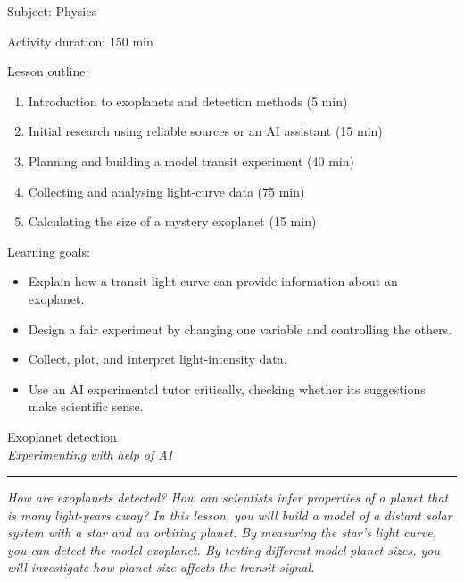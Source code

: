 \documentclass[12pt]{article}
\begin{document}
\hypersetup{pageanchor=true}

\vspace*{0.5\textheight}

Subject: Physics


\vspace{0.3cm}

Activity duration: 150 min

\vspace{0.5cm}

Lesson outline:
\begin{enumerate}
    \item Introduction to exoplanets and detection methods (5 min)
    \item Initial research using reliable sources or an AI assistant (15 min)
    \item Planning and building a model transit experiment (40 min)
    \item Collecting and analysing light-curve data (75 min)
    \item Calculating the size of a mystery exoplanet (15 min)
\end{enumerate}

Learning goals:

\begin{itemize}
    \item Explain how a transit light curve can provide information about an exoplanet.
    \item Design a fair experiment by changing one variable and controlling the others.
    \item Collect, plot, and interpret light-intensity data.
    \item Use an AI experimental tutor critically, checking whether its suggestions make scientific sense.
\end{itemize}

\newpage

\begin{center}
    {\LARGE \color{maincolor} Exoplanet detection}\\[5pt]
    {\large \textit{Experimenting with help of AI}}\\
    \rule{\linewidth}{1pt}
\end{center}

\vspace{0.5cm}

\textit{How are exoplanets detected? How can scientists infer properties of a planet that is many light-years away? In this lesson, you will build a model of a distant solar system with a star and an orbiting planet. By measuring the star's light curve, you can detect the model exoplanet. By testing different model planet sizes, you will investigate how planet size affects the transit signal.}
\end{document}
